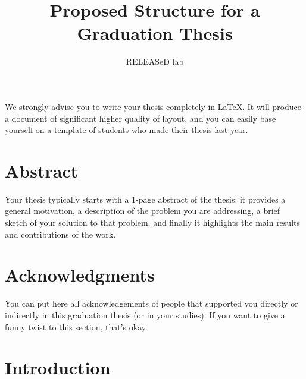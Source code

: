 \documentclass[british]{article}
\title{Proposed Structure for a Graduation Thesis}
\author{RELEASeD lab}
\begin{document}
\maketitle

We strongly advise you to write your thesis completely in \LaTeX. It
will produce a document of significant higher quality of layout, and
you can easily base yourself on a template of students who made their
thesis last year.

\section*{Abstract}

Your thesis typically starts with a 1-page abstract of the thesis: it provides a general motivation, a description of the problem you are addressing, a brief sketch of your solution to that problem, and finally it highlights the main results and contributions of the work.

\section*{Acknowledgments}

You can put here all acknowledgements of people that supported you directly or indirectly in this graduation thesis (or in your studies). If you want to give a funny twist to this section, that's okay.

\section*{Introduction}
\end{document}
